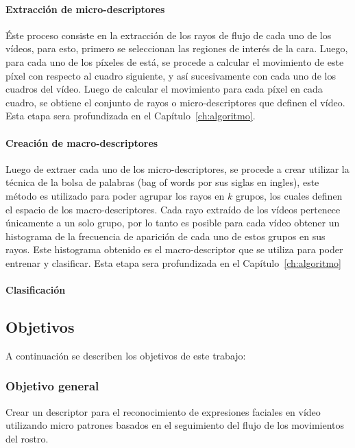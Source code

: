 \paragraph{Extracción de micro-descriptores}
\label{ch1:par:microdescriptores}
Éste proceso consiste en la extracción de los rayos de flujo de cada uno de los vídeos, para esto, primero se seleccionan las regiones de interés de la cara. Luego, para cada uno de los píxeles de está, se procede a calcular el movimiento de este píxel con respecto al cuadro siguiente, y así sucesivamente con cada uno de los cuadros del vídeo. Luego de calcular el movimiento para cada píxel en cada cuadro, se obtiene el conjunto de rayos o micro-descriptores que definen el vídeo. Esta etapa sera profundizada en el Capítulo~\ref{ch:algoritmo}.

\paragraph{Creación de macro-descriptores}
\label{ch1:par:macrodescriptores}
Luego de extraer cada uno de los micro-descriptores, se procede a crear utilizar la técnica de la bolsa de palabras (bag of words por sus siglas en ingles), este método es utilizado para poder agrupar los rayos en $k$ grupos, los cuales definen el espacio de los macro-descriptores. Cada rayo extraído de los vídeos pertenece únicamente a un solo grupo, por lo tanto es posible para cada vídeo obtener un histograma de la frecuencia de aparición de cada uno de estos grupos en sus rayos. Este histograma obtenido es el macro-descriptor que se utiliza para poder entrenar y clasificar. Esta etapa sera profundizada en el Capítulo~\ref{ch:algoritmo}

\paragraph{Clasificación}
\label{ch1:par:clasificacion}



\subsection{Objetivos}
\label{subsec:objetivos}
A continuación se describen los objetivos de este trabajo:

\subsubsection{Objetivo general}
\label{subsubsec:objgeneral}
Crear un descriptor para el reconocimiento de expresiones faciales en vídeo utilizando micro patrones basados en el seguimiento del flujo de los movimientos del rostro.


